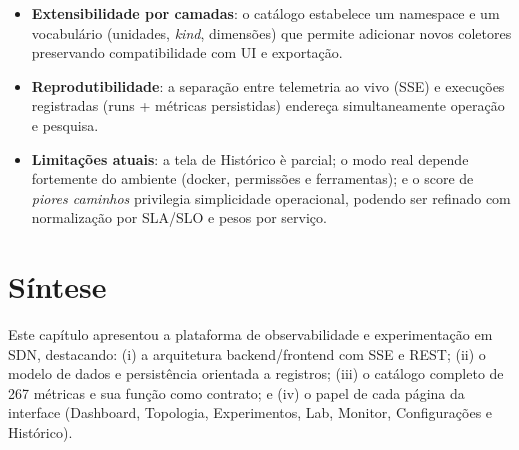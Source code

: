 \documentclass[12pt,oneside]{report}
\begin{document}
\begin{itemize}
\item \textbf{Extensibilidade por camadas}: o cat\'alogo estabelece um namespace e um vocabul\'ario (unidades, \textit{kind}, dimens\~oes) que permite adicionar novos coletores preservando compatibilidade com UI e exporta\c{c}\~ao.
\item \textbf{Reprodutibilidade}: a separa\c{c}\~ao entre telemetria ao vivo (SSE) e execu\c{c}\~oes registradas (runs + m\'etricas persistidas) endere\c{c}a simultaneamente opera\c{c}\~ao e pesquisa.
\item \textbf{Limita\c{c}\~oes atuais}: a tela de Hist\'orico \`e parcial; o modo real depende fortemente do ambiente (docker, permiss\~oes e ferramentas); e o score de \textit{piores caminhos} privilegia simplicidade operacional, podendo ser refinado com normaliza\c{c}\~ao por SLA/SLO e pesos por servi\c{c}o.
\end{itemize}

\section{S\'intese}
Este cap\'itulo apresentou a plataforma de observabilidade e experimenta\c{c}\~ao em SDN, destacando: (i) a arquitetura backend/frontend com SSE e REST; (ii) o modelo de dados e persist\^encia orientada a registros; (iii) o cat\'alogo completo de 267 m\'etricas e sua fun\c{c}\~ao como contrato; e (iv) o papel de cada p\'agina da interface (Dashboard, Topologia, Experimentos, Lab, Monitor, Configura\c{c}\~oes e Hist\'orico).
\end{document}
